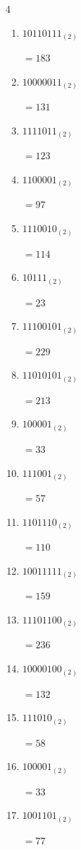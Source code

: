 \begin{multicols}{4}
\begin{enumerate}
        $=255$

  \item $10110111_{(2)}$

        $=183$

  \item $10000011_{(2)}$

        $=131$

\columnbreak %

  \item $1111011_{(2)}$

        $=123$

  \item $1100001_{(2)}$

        $=97$

  \item $1110010_{(2)}$

        $=114$

  \item $10111_{(2)}$

        $=23$

  \item $11100101_{(2)}$

        $=229$

  \item $11010101_{(2)}$

        $=213$

  \item $100001_{(2)}$

        $=33$

  \item $111001_{(2)}$

        $=57$

  \item $1101110_{(2)}$

        $=110$

  \item $10011111_{(2)}$

        $=159$

  \item $11101100_{(2)}$

        $=236$

  \item $10000100_{(2)}$

        $=132$

  \item $111010_{(2)}$

        $=58$

  \item $100001_{(2)}$

        $=33$

  \item $1001101_{(2)}$

        $=77$

\end{enumerate}
\end{multicols}

